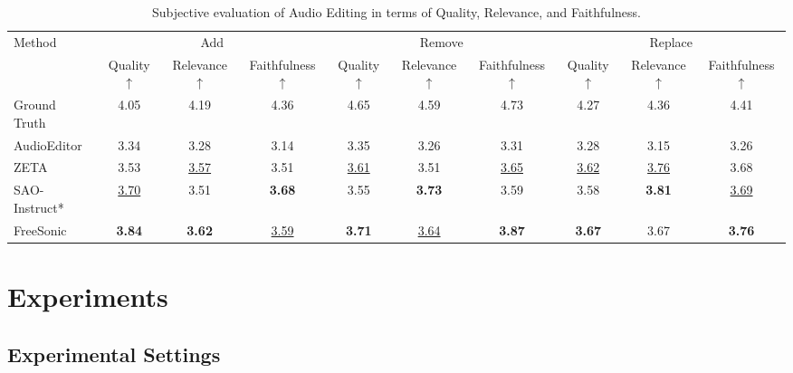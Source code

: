 \begin{table}
\centering
\scriptsize
\caption{Subjective evaluation of Audio Editing in terms of Quality, Relevance, and Faithfulness.}
\begin{tabular}{l|ccc|ccc|ccc}
\toprule
\multirow{2}{*}{Method} 
& \multicolumn{3}{c|}{Add} 
& \multicolumn{3}{c|}{Remove} 
& \multicolumn{3}{c}{Replace} \\
\cmidrule(lr){2-4} \cmidrule(lr){5-7} \cmidrule(lr){8-10}
& Quality$\uparrow$ & Relevance$\uparrow$ & Faithfulness$\uparrow$
& Quality$\uparrow$ & Relevance$\uparrow$ & Faithfulness$\uparrow$
& Quality$\uparrow$ & Relevance$\uparrow$ & Faithfulness$\uparrow$ \\
\midrule
Ground Truth  & 4.05 & 4.19 & 4.36 & 4.65 & 4.59 & 4.73 & 4.27 & 4.36 & 4.41 \\
\midrule
AudioEditor   & 3.34 & 3.28 & 3.14 & 3.35 & 3.26 & 3.31 & 3.28 & 3.15 & 3.26 \\
ZETA          & 3.53 & \underline{3.57} & 3.51 & \underline{3.61} & 3.51 & \underline{3.65} & \underline{3.62} & \underline{3.76} & 3.68 \\
SAO-Instruct* & \underline{3.70} & 3.51 & \textbf{3.68} & 3.55 & \textbf{3.73} & 3.59 & 3.58 & \textbf{3.81} & \underline{3.69} \\
FreeSonic     & \textbf{3.84} & \textbf{3.62} & \underline{3.59} & \textbf{3.71} & \underline{3.64} & \textbf{3.87} & \textbf{3.67} & 3.67 & \textbf{3.76} \\
\bottomrule
\end{tabular}
\label{tab:sub}
\vspace{-1em}
\end{table}

\section{Experiments}

\subsection{Experimental Settings}

